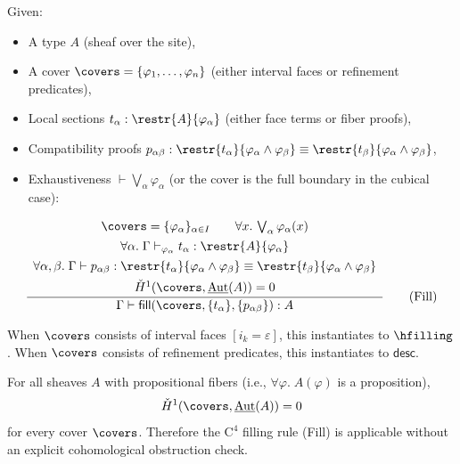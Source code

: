 \begin{definition}
\label{def:unified-filling}
Given:
\begin{itemize}
\item A type \(A\) (sheaf over the site),
\item A cover \(\covers = \{\varphi_1, \ldots, \varphi_n\}\)
  (either interval faces or refinement predicates),
\item Local sections \(t_\alpha : \restr{A}{\varphi_\alpha}\)
  (either face terms or fiber proofs),
\item Compatibility proofs \(p_{\alpha\beta} :
  \restr{t_\alpha}{\varphi_\alpha \wedge \varphi_\beta}
  \equiv
  \restr{t_\beta}{\varphi_\alpha \wedge \varphi_\beta}\),
\item Exhaustiveness \(\vdash \bigvee_\alpha \varphi_\alpha\) (or
  the cover is the full boundary in the cubical case):
\end{itemize}
\[
\frac{
  \begin{array}{c}
    \covers = \{\varphi_\alpha\}_{\alpha \in I}
    \qquad
    \forall x.\, \bigvee_\alpha \varphi_\alpha(x)
    \\[4pt]
    \forall \alpha.\;
    \Gamma \vdash_{\varphi_\alpha} t_\alpha : \restr{A}{\varphi_\alpha}
    \\[4pt]
    \forall \alpha, \beta.\;
    \Gamma \vdash p_{\alpha\beta}
    : \restr{t_\alpha}{\varphi_\alpha \wedge \varphi_\beta}
    \equiv
    \restr{t_\beta}{\varphi_\alpha \wedge \varphi_\beta}
    \\[4pt]
    \check{H}^1(\covers, \underline{\mathrm{Aut}}(A)) = 0
  \end{array}
}
{
  \Gamma \vdash
  \mathsf{fill}(\covers, \{t_\alpha\}, \{p_{\alpha\beta}\}) : A
}
\tag{Fill}
\]
\end{definition}

When \(\covers\) consists of interval faces \([i_k = \varepsilon]\),
this instantiates to \(\hfilling\).  When \(\covers\) consists of
refinement predicates, this instantiates to \(\mathsf{desc}\).

\begin{theorem}
\label{thm:hedberg-collapse}
For all sheaves \(A\) with propositional fibers (i.e.,
\(\forall \varphi.\; A(\varphi)\) is a proposition),
\[
  \check{H}^1(\covers, \underline{\mathrm{Aut}}(A)) = 0
\]
for every cover \(\covers\).  Therefore the \(\mathrm{C}^4\)
filling rule \textup{(Fill)} is applicable without an explicit
cohomological obstruction check.
\end{theorem}

